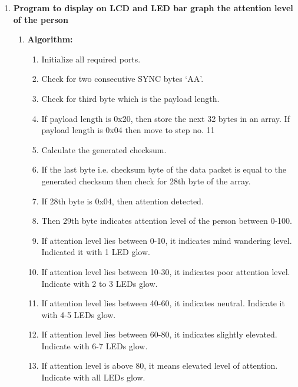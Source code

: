 \documentclass[12pt]{article}
\begin{document}
\begin{enumerate}
	\item \textbf{{\large Program to  display on LCD and LED bar graph the attention level of the person}}

\begin{enumerate}
	\item \textbf{Algorithm{\large  :}}

\begin{enumerate}
\item Initialize all required ports.
\item Check for two consecutive SYNC bytes ‘AA’.
\item Check for third byte which is the payload length.
\item If payload length is 0x20, then store the next 32 bytes in an array. If payload length is 0x04 then move to step no. 11
\item Calculate the generated checksum.
\item If the last byte i.e. checksum byte of the data packet is equal to the generated checksum then check for 28th byte of the array.
\item If 28th byte is 0x04, then attention detected.
\item Then 29th byte indicates attention level of the person between 0-100.
\item If attention level lies between 0-10, it indicates mind wandering level. Indicated it with 1 LED glow.
\item If attention level lies between 10-30, it indicates poor attention level. Indicate with 2 to 3 LEDs glow.
\item If attention level lies between 40-60, it indicates neutral. Indicate it with 4-5 LEDs glow.
\item If attention level lies between 60-80, it indicates slightly elevated. Indicate with 6-7 LEDs glow.
\item If attention level is above 80, it means elevated level of attention. Indicate with all LEDs glow.
\end{enumerate}
	\end{enumerate}
\break


\end{enumerate}
\end{document}
